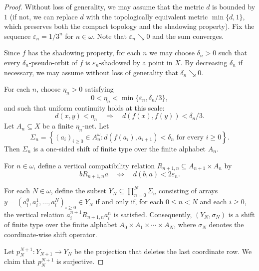\documentclass[12pt]{amsart}
\theoremstyle{definition}
\numberwithin{equation}{section}
\theoremstyle{remark}
\begin{document}
\begin{proof}
Without loss of generality, we may assume that the metric $d$ is bounded by $1$ (if not, we can replace $d$ with the topologically equivalent metric $\min\{d, 1\}$, which preserves both the compact topology and the shadowing property). Fix the sequence $\varepsilon_n = 1/3^n$ for $n\in\omega$. Note that $\varepsilon_n \searrow 0$ and the sum converges.

Since $f$ has the shadowing property, for each $n$ we may choose $\delta_n>0$ such that every $\delta_n$-pseudo-orbit of $f$ is $\varepsilon_n$-shadowed by a point in $X$. By decreasing $\delta_n$ if necessary, we may assume without loss of generality that $\delta_n \searrow 0$.

For each $n$, choose $\eta_n>0$ satisfying
\begin{equation}\label{eq:eta_bound}
        0 < \eta_n < \min\{\varepsilon_n, \delta_n/3\},
\end{equation}
and such that uniform continuity holds at this scale:
\begin{equation}\label{eq:unif_cont}
        d(x,y) < \eta_n
        \quad\Longrightarrow\quad
        d(f(x),f(y)) < \delta_n/3.
\end{equation}
Let $A_n \subseteq X$ be a finite $\eta_n$-net. Let
\[
        \Sigma_n
        =
        \left\{ (a_i)_{i\geq 0} \in A_n^{\omega} : d(f(a_i),a_{i+1}) < \delta_n \text{ for every } i \geq 0 \right\}.
\]
Then $\Sigma_n$ is a one-sided shift of finite type over the finite alphabet $A_n$. %

For $n\in\omega$, define a vertical compatibility relation $R_{n+1,n} \subseteq A_{n+1} \times A_n$ by
\[
        b \mathrel{R_{n+1,n}} a
        \quad\Longleftrightarrow\quad
        d(b,a) < 2\varepsilon_n.
\]

For each $N\in\omega$, define the subset $Y_N \subseteq \prod_{n=0}^{N} \Sigma_n$ consisting of arrays $y = (a_i^0, a_i^1, \dots, a_i^N)_{i\geq 0} \in Y_N$ if and only if, for each $0 \leq n < N$ and each $i \geq 0$, the vertical relation $a_i^{n+1} \mathrel{R_{n+1,n}} a_i^n$ is satisfied. Consequently, $(Y_N, \sigma_N)$ is a shift of finite type over the finite alphabet $A_0 \times A_1 \times \cdots \times A_N$, where $\sigma_N$ denotes the coordinate-wise shift operator.

Let $p_N^{N+1}: Y_{N+1} \to Y_N$ be the projection that deletes the last coordinate row. We claim that $p_N^{N+1}$ is surjective.


\end{proof}
\end{document}
